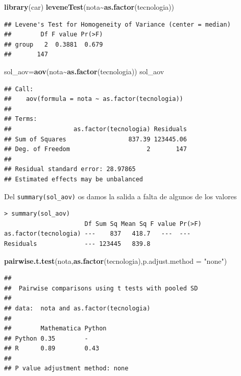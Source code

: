 \documentclass[
]{article}
\newenvironment{Shaded}{\begin{snugshade}}{\end{snugshade}}
\newcommand{\DataTypeTok}[1]{\textcolor[rgb]{0.13,0.29,0.53}{#1}}
\newcommand{\KeywordTok}[1]{\textcolor[rgb]{0.13,0.29,0.53}{\textbf{#1}}}
\newcommand{\NormalTok}[1]{#1}
\newcommand{\OperatorTok}[1]{\textcolor[rgb]{0.81,0.36,0.00}{\textbf{#1}}}
\newcommand{\StringTok}[1]{\textcolor[rgb]{0.31,0.60,0.02}{#1}}
\begin{document}
\begin{Shaded}
\begin{Highlighting}[]
\KeywordTok{library}\NormalTok{(car)}
\KeywordTok{leveneTest}\NormalTok{(nota}\OperatorTok{\textasciitilde{}}\KeywordTok{as.factor}\NormalTok{(tecnologia))}
\end{Highlighting}
\end{Shaded}

\begin{verbatim}
## Levene's Test for Homogeneity of Variance (center = median)
##        Df F value Pr(>F)
## group   2  0.3881  0.679
##       147
\end{verbatim}

\begin{Shaded}
\begin{Highlighting}[]
\NormalTok{sol\_aov=}\KeywordTok{aov}\NormalTok{(nota}\OperatorTok{\textasciitilde{}}\KeywordTok{as.factor}\NormalTok{(tecnologia))}
\NormalTok{sol\_aov}
\end{Highlighting}
\end{Shaded}

\begin{verbatim}
## Call:
##    aov(formula = nota ~ as.factor(tecnologia))
## 
## Terms:
##                 as.factor(tecnologia) Residuals
## Sum of Squares                 837.39 123445.06
## Deg. of Freedom                     2       147
## 
## Residual standard error: 28.97865
## Estimated effects may be unbalanced
\end{verbatim}

Del \texttt{summary(sol\_aov)} os damos la salida a falta de algunos de
los valores

\begin{verbatim}
> summary(sol_aov)
                      Df Sum Sq Mean Sq F value Pr(>F)
as.factor(tecnologia) ---    837   418.7   ---  ---
Residuals             --- 123445   839.8                          
\end{verbatim}

\begin{Shaded}
\begin{Highlighting}[]
\KeywordTok{pairwise.t.test}\NormalTok{(nota,}\KeywordTok{as.factor}\NormalTok{(tecnologia),}\DataTypeTok{p.adjust.method =} \StringTok{"none"}\NormalTok{)}
\end{Highlighting}
\end{Shaded}

\begin{verbatim}
## 
##  Pairwise comparisons using t tests with pooled SD 
## 
## data:  nota and as.factor(tecnologia) 
## 
##        Mathematica Python
## Python 0.35        -     
## R      0.89        0.43  
## 
## P value adjustment method: none
\end{verbatim}
\end{document}

